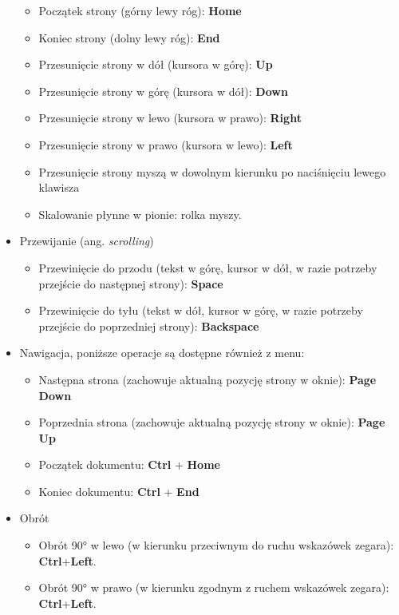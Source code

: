 \documentclass{mwart}
\def\key#1{\textbf{#1}}
\begin{document}
\begin{itemize}
    \begin{itemize}
    \item Początek strony (górny lewy róg): \key{Home}
    \item Koniec strony (dolny lewy róg): \key{End}
    \item Przesunięcie strony w dół (kursora w górę): \key{Up}
    \item Przesunięcie strony w górę (kursora w dół): \key{Down}
    \item Przesunięcie strony w lewo (kursora w prawo): \key{Right}
    \item Przesunięcie strony w prawo (kursora w lewo): \key{Left}
    \item Przesunięcie strony myszą w dowolnym kierunku po naciśnięciu
lewego klawisza
   \item Skalowanie płynne w pionie: rolka myszy.
    \end{itemize}
  \item Przewijanie (ang. \textit{scrolling})
    \begin{itemize}
    \item Przewinięcie do przodu (tekst w górę, kursor w dół, w razie
potrzeby przejście do następnej strony): \key{Space}
    \item Przewinięcie do tyłu (tekst w dół, kursor w górę, w razie
potrzeby przejście do poprzedniej strony): \key{Backspace}
    \end{itemize}
  \item Nawigacja, poniższe operacje są dostępne również z menu:
    \begin{itemize}
    \item Następna strona (zachowuje aktualną pozycję strony w oknie): \key{Page Down}
    \item Poprzednia strona (zachowuje aktualną pozycję strony w oknie): \key{Page Up}
    \item Początek dokumentu: \key{Ctrl} + \key{Home}
    \item Koniec dokumentu: \key{Ctrl} + \key{End}
    \end{itemize}
  \item Obrót
    \begin{itemize}
    \item Obrót 90° w lewo (w kierunku przeciwnym do ruchu wskazówek
      zegara): \key{Ctrl}+\key{Left}.
    \item Obrót 90° w prawo (w kierunku zgodnym z ruchem wskazówek
      zegara): \key{Ctrl}+\key{Left}.
    \end{itemize}

\end{itemize}
\end{document}
